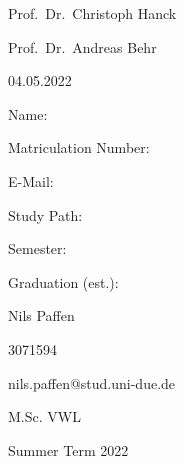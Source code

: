 \documentclass[12pt,a4paper]{article}
\begin{document}
\begin{titlepage}
  \noindent\begin{minipage}[t]{0.3\textwidth}
  \end{minipage}
  \begin{minipage}[t]{0.7\textwidth}
  \hspace{1cm}Prof.~Dr.~Christoph Hanck
  \end{minipage}
  
  \noindent\begin{minipage}[t]{0.3\textwidth}
  \end{minipage}
  \begin{minipage}[t]{0.7\textwidth}
  \hspace{1cm}Prof.~Dr.~Andreas Behr
  \end{minipage}

  \noindent\begin{minipage}[t]{0.3\textwidth}
  \end{minipage}
  \begin{minipage}[t]{0.7\textwidth}
  \hspace{1cm}04.05.2022
  \end{minipage}

  \hrulefill

  \begin{multicols}{3}

  Name:

  Matriculation Number:

  E-Mail:

  Study Path:

  Semester:

  Graduation (est.):
 
 
  
  \columnbreak

  Nils Paffen

  3071594
  
  \begin{scriptsize} 
  nils.paffen@stud.uni-due.de 
  \end{scriptsize}

   M.Sc. VWL


  Summer Term 2022

	\end{multicols}

\end{titlepage}
\end{document}
